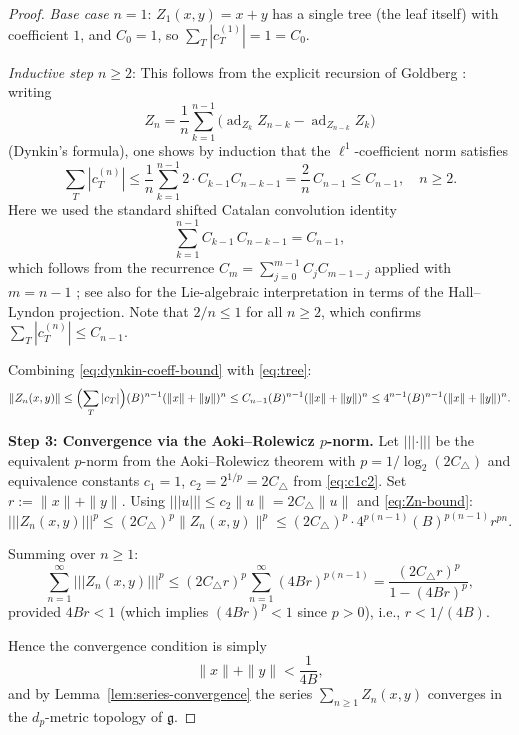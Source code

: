 \documentclass[10pt]{amsart}
\theoremstyle{definition}
\theoremstyle{remark}
\numberwithin{equation}{section}
\DeclareMathOperator{\ad}{ad}
\newcommand{\Ctri}{C_{\triangle}}    %
\newcommand{\Cbracket}{B}            %
\newcommand{\pnorm}[1]{\left\vert\!\left\vert\!\left\vert #1 \right\vert\!\right\vert\!\right\vert} %
\begin{document}
\begin{proof}
\emph{Base case} $n = 1$: $Z_1(x,y) = x + y$ has a single tree (the leaf itself) with
coefficient $1$, and $C_0 = 1$, so $\sum_T |c_T^{(1)}| = 1 = C_0$. \checkmark

\emph{Inductive step} $n \ge 2$: This follows from the explicit recursion of Goldberg
\cite[pp.~13--15]{Goldberg1956}: writing
\[
  Z_n = \frac{1}{n}\sum_{k=1}^{n-1} \bigl(\ad_{Z_k} Z_{n-k} - \ad_{Z_{n-k}} Z_k\bigr)
\]
(Dynkin's formula), one shows by induction that the $\ell^1$-coefficient norm satisfies
\[
  \sum_T|c_T^{(n)}| \le \frac{1}{n}\sum_{k=1}^{n-1} 2\cdot C_{k-1} C_{n-k-1} = \frac{2}{n}\,C_{n-1}
  \le C_{n-1}, \quad n \ge 2.
\]
Here we used the standard shifted Catalan convolution identity
\[
  \sum_{k=1}^{n-1} C_{k-1}\,C_{n-k-1} = C_{n-1},
\]
which follows from the recurrence $C_m = \sum_{j=0}^{m-1}C_j C_{m-1-j}$ applied with
$m = n-1$ \cite[Ch.~II, \S6, No.~4]{Bourbaki1989}; see also
\cite[Remark~2.4]{Reutenauer1993} for the Lie-algebraic interpretation in terms of the
Hall--Lyndon projection.
Note that $2/n \le 1$ for all $n \ge 2$, which confirms $\sum_T|c_T^{(n)}| \le C_{n-1}$.

Combining \eqref{eq:dynkin-coeff-bound} with \eqref{eq:tree}:
\begin{equation}\label{eq:Zn-bound}
  \|Z_n(x,y)\|
  \le \Bigl(\sum_T |c_T|\Bigr) (\Cbracket)^{n-1} (\|x\|+\|y\|)^n
  \le C_{n-1}(\Cbracket)^{n-1}(\|x\|+\|y\|)^n
  \le 4^{n-1}(\Cbracket)^{n-1}(\|x\|+\|y\|)^n.
\end{equation}

\medskip
\noindent\textbf{Step 3: Convergence via the Aoki--Rolewicz $p$-norm.}
Let $\pnorm{\cdot}$ be the equivalent $p$-norm from the Aoki--Rolewicz theorem with
$p = 1/\log_2(2\Ctri)$ and equivalence constants $c_1 = 1$, $c_2 = 2^{1/p} = 2\Ctri$
from \eqref{eq:c1c2}.  Set $r := \|x\|+\|y\|$.  Using $\pnorm{u} \le c_2\|u\| = 2\Ctri\|u\|$
and \eqref{eq:Zn-bound}:
\begin{equation}\label{eq:pnorm-bound}
  \pnorm{Z_n(x,y)}^p
  \le (2\Ctri)^p \|Z_n(x,y)\|^p
  \le (2\Ctri)^p \cdot 4^{p(n-1)}(\Cbracket)^{p(n-1)} r^{pn}.
\end{equation}

Summing over $n\ge 1$:
\[
  \sum_{n=1}^\infty \pnorm{Z_n(x,y)}^p
  \le (2\Ctri r)^p \sum_{n=1}^\infty (4\Cbracket r)^{p(n-1)}
  = \frac{(2\Ctri r)^p}{1-(4\Cbracket r)^p},
\]
provided $4\Cbracket r < 1$ (which implies $(4\Cbracket r)^p < 1$ since $p > 0$),
i.e., $r < 1/(4\Cbracket)$.

Hence the convergence condition is simply
\[
  \|x\|+\|y\| < \frac{1}{4\Cbracket},
\]
and by Lemma~\ref{lem:series-convergence} the series $\sum_{n\ge 1} Z_n(x,y)$ converges
in the $d_p$-metric topology of $\mathfrak{g}$.


\end{proof}
\end{document}
